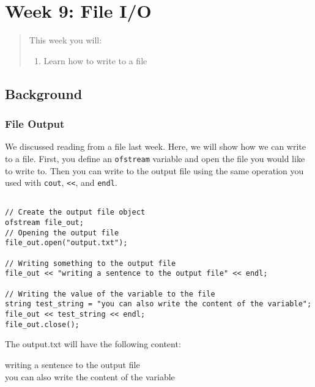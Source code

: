\chapter*{Week 9: File I/O}
\setcounter{chapter}{10}
\setcounter{section}{0}

\begin{abstract}
This week you will:
\begin{enumerate}
    \item Learn how to write to a file

\end{enumerate}
    
\end{abstract}

\section{Background}
\subsection{File Output}
We discussed reading from a file last week. Here, we will show how we can write to a file. First, you define an \texttt{ofstream} variable and open the file you would like to write to. Then you can write to the output file using the same operation you used with \texttt{cout}, \texttt{<<}, and \texttt{endl}.

\begin{example}
    \begin{verbatim}
    
// Create the output file object
ofstream file_out;
// Opening the output file
file_out.open("output.txt");

// Writing something to the output file
file_out << "writing a sentence to the output file" << endl;

// Writing the value of the variable to the file
string test_string = "you can also write the content of the variable";
file_out << test_string << endl;
file_out.close();
    \end{verbatim}
\end{example}

The output.txt will have the following content:

\begin{sample}
writing a sentence to the output file\\
you can also write the content of the variable
\end{sample}

